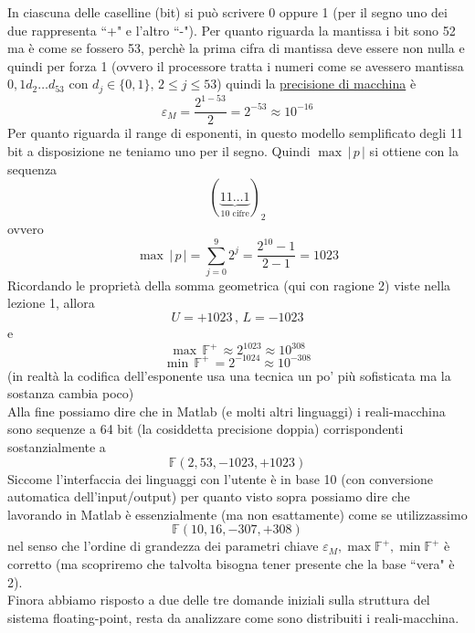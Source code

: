 \documentclass[12pt]{article}
\begin{document}
In ciascuna delle caselline (bit) si può scrivere 0 oppure 1 (per il segno uno dei due rappresenta ``+" e l'altro ``-"). Per quanto riguarda la mantissa i bit sono 52 ma è come se fossero 53, perchè la prima cifra di mantissa deve essere non nulla e quindi per forza 1 (ovvero il processore tratta i numeri come se avessero mantissa $0,1 d_2 \dotsc d_{53}$ con $d_j \in \{0,1\},\, 2 \le j \le 53$) quindi la \uline{precisione di macchina} è
\[ \varepsilon_M = \frac{2^{1-53}}{2} = 2^{-53} \approx 10^{-16}\]
Per quanto riguarda il range di esponenti, in questo modello semplificato degli 11 bit a disposizione ne teniamo uno per il segno. Quindi $\max \, \lvert \, p \, \rvert$ si ottiene con la sequenza
\[ (\underbrace{11\dotsc1}_{\text{10 cifre}})_2 \]
ovvero
\[ \max \, \lvert \, p \, \rvert = \sum_{j=0}^9 2^j = \frac{2^{10} - 1}{2 - 1} = 1023 \]
Ricordando le proprietà della somma geometrica (qui con ragione 2) viste nella lezione 1, allora \[ U = +1023 \,,\, L = -1023 \] e
\[ \max \, \mathbb{F}^+ \, \approx 2^{1023} \approx 10^{308}\]
\[ \min \, \mathbb{F}^+ \, = 2^{-1024} \approx 10^{-308}\]
(in realtà la codifica dell'esponente usa una tecnica un po' più sofisticata ma la sostanza cambia poco) \\
Alla fine possiamo dire che in Matlab (e molti altri linguaggi) i reali-macchina sono sequenze a 64 bit (la cosiddetta precisione doppia) corrispondenti sostanzialmente a
\[ \mathbb{F}(2, 53, -1023, +1023) \]
Siccome l'interfaccia dei linguaggi con l'utente è in base 10 (con conversione automatica dell'input/output) per quanto visto sopra possiamo dire che lavorando in Matlab è essenzialmente (ma non esattamente) come se utilizzassimo
\[ \mathbb{F}(10, 16, -307, +308) \]
nel senso che l'ordine di grandezza dei parametri chiave $\varepsilon_M, \max \mathbb{F}^+, \min \mathbb{F}^+$ è corretto (ma scopriremo che talvolta bisogna tener presente che la base ``vera" è 2). \\
Finora abbiamo risposto a due delle tre domande iniziali sulla struttura del sistema floating-point, resta da analizzare come sono distribuiti i reali-macchina.
\end{document}

